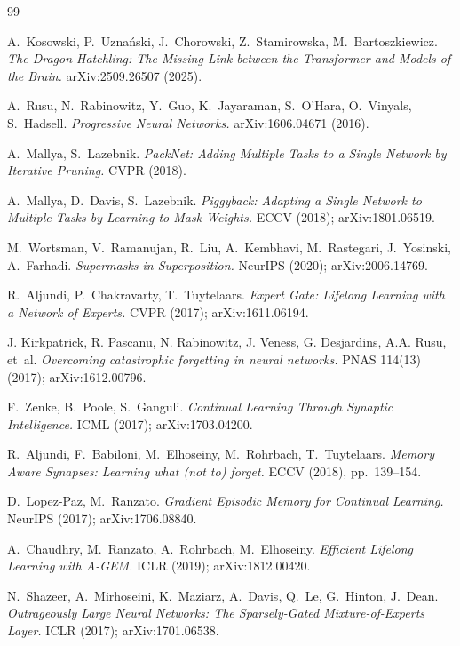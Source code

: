 \documentclass[11pt]{article}
\theoremstyle{definition}\newtheorem{definition}{Definition}
\theoremstyle{remark}\newtheorem{remark}{Remark}
\begin{document}
\begin{thebibliography}{99}\small

 A.~Kosowski, P.~Uzna\'nski, J.~Chorowski, Z.~Stamirowska, M.~Bartoszkiewicz.
\emph{The Dragon Hatchling: The Missing Link between the Transformer and Models of the
Brain.} arXiv:2509.26507 (2025).

 A.~Rusu, N.~Rabinowitz, Y.~Guo, K.~Jayaraman, S.~O'Hara, O.~Vinyals,
S.~Hadsell. \emph{Progressive Neural Networks.} arXiv:1606.04671 (2016).

 A.~Mallya, S.~Lazebnik. \emph{PackNet: Adding Multiple Tasks to a
Single Network by Iterative Pruning.} CVPR (2018).

 A.~Mallya, D.~Davis, S.~Lazebnik. \emph{Piggyback: Adapting a
Single Network to Multiple Tasks by Learning to Mask Weights.} ECCV (2018); arXiv:1801.06519.

 M.~Wortsman, V.~Ramanujan, R.~Liu, A.~Kembhavi, M.~Rastegari, J.~Yosinski, A.~Farhadi. \emph{Supermasks in Superposition.} NeurIPS (2020); arXiv:2006.14769.

 R.~Aljundi, P.~Chakravarty, T.~Tuytelaars. \emph{Expert Gate: Lifelong Learning with a Network of Experts.} CVPR (2017); arXiv:1611.06194.

 J. Kirkpatrick, R. Pascanu, N. Rabinowitz, J. Veness, G. Desjardins, A.A. Rusu, et~al. \emph{Overcoming catastrophic forgetting in neural networks.} PNAS 114(13) (2017); arXiv:1612.00796.

 F.~Zenke, B.~Poole, S.~Ganguli. \emph{Continual Learning Through Synaptic
Intelligence.} ICML (2017); arXiv:1703.04200.

 R.~Aljundi, F.~Babiloni, M.~Elhoseiny, M.~Rohrbach, T.~Tuytelaars. \emph{Memory Aware Synapses: Learning what (not to) forget.} ECCV (2018), pp.~139--154.

 D.~Lopez-Paz, M.~Ranzato. \emph{Gradient Episodic Memory for
Continual Learning.} NeurIPS (2017); arXiv:1706.08840.

 A.~Chaudhry, M.~Ranzato, A.~Rohrbach, M.~Elhoseiny. \emph{Efficient
Lifelong Learning with A-GEM.} ICLR (2019); arXiv:1812.00420.

 N.~Shazeer, A.~Mirhoseini, K.~Maziarz, A.~Davis, Q.~Le, G.~Hinton,
J.~Dean. \emph{Outrageously Large Neural Networks: The Sparsely-Gated
Mixture-of-Experts Layer.} ICLR (2017); arXiv:1701.06538.


\end{thebibliography}
\end{document}
